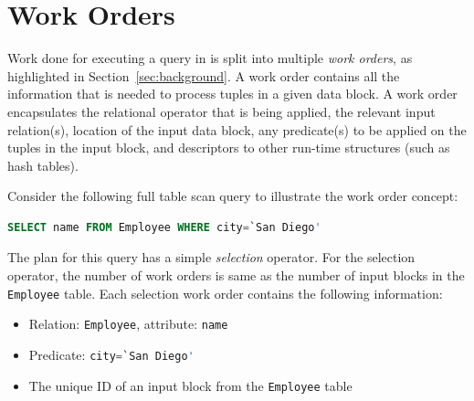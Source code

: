 \section{Work Orders}\label{apx:workorders}
Work done for executing a query in \sys{} is split into multiple \textit{work 
orders}, as highlighted in Section~\ref{sec:background}. 
A work order contains all the information that is needed to process tuples in a given 
data block. 
A work order encapsulates the relational operator that is being applied, the relevant 
input relation(s), location of the input data block, any predicate(s) to be 
applied on the tuples in the input block, and descriptors to other run-time 
structures (such as hash tables).

Consider the following full table scan query to illustrate the work order concept:

\begin{lstlisting}[language=SQL, 
basicstyle=\ttfamily\small, 
showstringspaces=false,
keywordstyle=\color{cardinal}\bfseries, 
emph={San,Diego}, 
emphstyle=\color{bondiblue}\bfseries]
SELECT name FROM Employee WHERE city=`San Diego'
\end{lstlisting}	
\vspace{-0.4em}

The plan for this query has a simple \textit{selection} operator.  
For the selection operator, the number of work orders is same as the number of input blocks in the \verb+Employee+ table. 
Each selection work order contains the following information:
\begin{itemize}
\itemsep0.1em
\item {Relation: \verb+Employee+, attribute: \verb|name|}
\item {Predicate: \lstinline[language=SQL, 
                                   basicstyle=\ttfamily\small, 
                                   keywordstyle=\color{cardinal} \bfseries,
                                   emph={San,Diego}, 
                                   emphstyle=\color{bondiblue}\bfseries]|city=`San Diego'|}
\item {The unique ID of an input block from the \verb+Employee+ table}
\end{itemize}

